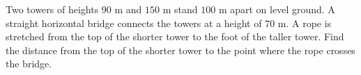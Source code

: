 Two towers of heights $90$ m and $150$ m stand $100$ m apart on level ground. A straight horizontal bridge connects the towers at a height of $70$ m. A rope is stretched from the top of the shorter tower to the foot of the taller tower. Find the distance from the top of the shorter tower to the point where the rope crosses the bridge.
